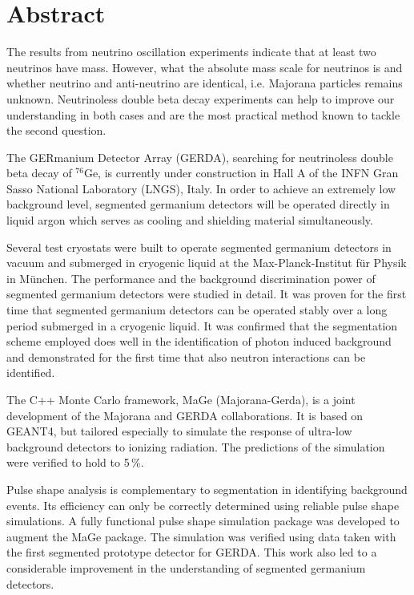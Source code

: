 \section*{Abstract} 
The results from neutrino oscillation experiments indicate that at
least two neutrinos have mass. However, what the absolute mass scale
for neutrinos is and whether neutrino and anti-neutrino are identical,
i.e. Majorana particles remains unknown.  Neutrinoless double beta
decay experiments can help to improve our understanding in both cases
and are the most practical method known to tackle the second question.
 
The GERmanium Detector Array (GERDA), searching for neutrinoless
double beta decay of $^{76}$Ge, is currently under construction in
Hall A of the INFN Gran Sasso National Laboratory (LNGS), Italy. In
order to achieve an extremely low background level, segmented
germanium detectors will be operated directly in liquid argon which
serves as cooling and shielding material simultaneously.
 
Several test cryostats were built to operate segmented germanium
detectors in vacuum and submerged in cryogenic liquid at the
Max-Planck-Institut f\"ur Physik in M\"unchen. The performance and the
background discrimination power of segmented germanium detectors were
studied in detail.  It was proven for the first time that segmented
germanium detectors can be operated stably over a long period
submerged in a cryogenic liquid.  It was confirmed that the
segmentation scheme employed does well in the identification of photon
induced background and demonstrated for the first time that also
neutron interactions can be identified.
 
 
The C++ Monte Carlo framework, MaGe (Majorana-Gerda), is a joint
development of the Majorana and GERDA collaborations.  It is based on
GEANT4, but tailored especially to simulate the response of ultra-low
background detectors to ionizing radiation.  The predictions of the
simulation were verified to hold to 5\,\%.
 
Pulse shape analysis is complementary to segmentation in identifying
background events.  Its efficiency can only be correctly determined
using reliable pulse shape simulations.  A fully functional pulse
shape simulation package was developed to augment the MaGe
package. The simulation was verified using data taken with the first
segmented prototype detector for GERDA. This work also led to a
considerable improvement in the understanding of segmented germanium
detectors.
 
